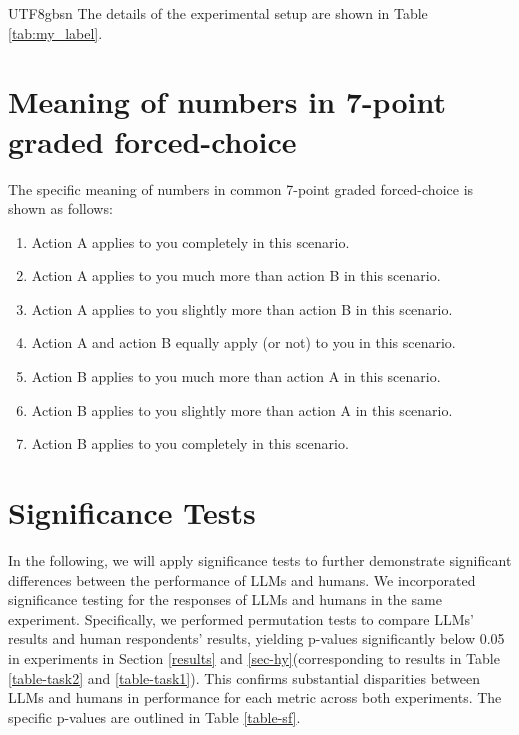 \documentclass{article}
\theoremstyle{plain}
\theoremstyle{definition}
\theoremstyle{remark}
\begin{document}
\begin{CJK*}{UTF8}{gbsn}
\label{ap-es}
The details of the experimental setup are shown in Table \ref{tab:my_label}.



\section{Meaning of numbers in 7-point graded forced-choice}\label{ap-mfc}
The specific meaning of numbers in common 7-point graded forced-choice is shown as follows:

\begin{enumerate}
    \item Action A applies to you completely in this scenario. 
    \item Action A applies to you much more than action B in this scenario. 
    \item Action A applies to you slightly more than action B in this scenario. 
    \item Action A and action B equally apply (or not) to you in this scenario.
    \item Action B applies to you much more than action A in this scenario. 
    \item Action B applies to you slightly more than action A in this scenario. 
    \item Action B applies to you completely in this scenario. 
\end{enumerate}


\iffalse
\section{Significance Tests} \label{sf}
In the following, we will apply significance tests to further demonstrate significant differences between the performance of LLMs and humans. We incorporated significance testing for the responses of LLMs and humans in the same experiment. Specifically, we performed permutation tests to compare LLMs' results and human respondents' results, yielding p-values significantly below 0.05 in experiments in Section \ref{results} and \ref{sec-hy}(corresponding to results in Table \ref{table-task2} and \ref{table-task1}). This confirms substantial disparities between LLMs and humans in performance for each metric across both experiments. The specific p-values are outlined in Table \ref{table-sf}.



\end{CJK*}
\end{document}
